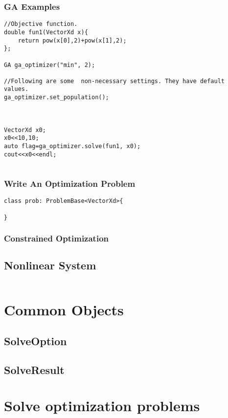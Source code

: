 \subsubsection{GA  Examples}
\begin{lstlisting}
//Objective function.
double fun1(VectorXd x){
	return pow(x[0],2)+pow(x[1],2);
};

GA ga_optimizer("min", 2);

//Following are some  non-necessary settings. They have default values.
ga_optimizer.set_population();



VectorXd x0;
x0<<10,10;
auto flag=ga_optimizer.solve(fun1, x0);
cout<<x0<<endl;


\end{lstlisting}


\subsubsection{Write An Optimization Problem}
\begin{lstlisting}
class prob: ProblemBase<VectorXd>{
	
}
\end{lstlisting}

\subsubsection{Constrained Optimization}


\subsection{Nonlinear System}
\begin{lstlisting}

\end{lstlisting}

\section{Common Objects}
\subsection{SolveOption}

\subsection{SolveResult}

\section{Solve optimization problems}
